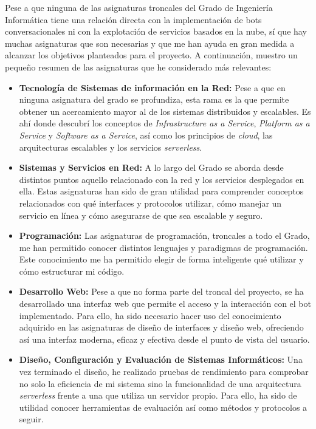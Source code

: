 \documentclass[11pt,spanish,listoffigures]{tfgetsinf}
\begin{document}
Pese a que ninguna de las asignaturas troncales del Grado de Ingeniería Informática tiene una relación directa con la implementación de bots conversacionales ni con la explotación de servicios basados en la nube, sí que hay muchas asignaturas que son necesarias y que me han ayuda en gran medida a alcanzar los objetivos planteados para el proyecto. A continuación, muestro un pequeño resumen de las asignaturas que he considerado más relevantes:

\begin{itemize}
\item \textbf{Tecnología de Sistemas de información en la Red:} Pese a que en ninguna asignatura del grado se profundiza, esta rama es la que permite obtener un acercamiento mayor al de los sistemas distribuidos y escalables. Es ahí donde descubrí los conceptos de \textit{Infrastructure as a Service}, \textit{Platform as a Service} y \textit{Software as a Service}, así como los principios de \textit{cloud}, las arquitecturas escalables y los servicios \textit{serverless}.

\item \textbf{Sistemas y Servicios en Red:} A lo largo del Grado se aborda desde distintos puntos aquello relacionado con la red y los servicios desplegados en ella. Estas asignaturas han sido de gran utilidad para comprender conceptos relacionados con qué interfaces y protocolos utilizar, cómo manejar un servicio en línea y cómo asegurarse de que sea escalable y seguro. 

\item \textbf{Programación:} Las asignaturas de programación, troncales a todo el Grado, me han permitido conocer distintos lenguajes y paradigmas de programación. Este conocimiento me ha permitido elegir de forma inteligente qué utilizar y cómo estructurar mi código.

\item \textbf{Desarrollo Web:} Pese a que no forma parte del troncal del proyecto, se ha desarrollado una interfaz web que permite el acceso y la interacción con el bot implementado. Para ello, ha sido necesario hacer uso del conocimiento adquirido en las asignaturas de diseño de interfaces y diseño web, ofreciendo así una interfaz moderna, eficaz y efectiva desde el punto de vista del usuario. 

\item \textbf{Diseño, Configuración y Evaluación de Sistemas Informáticos:} Una vez terminado el diseño, he realizado pruebas de rendimiento para comprobar no solo la eficiencia de mi sistema sino la funcionalidad de una arquitectura \textit{serverless} frente a una que utiliza un servidor propio. Para ello, ha sido de utilidad conocer herramientas de evaluación así como métodos y protocolos a seguir.


\end{itemize}
\end{document}
